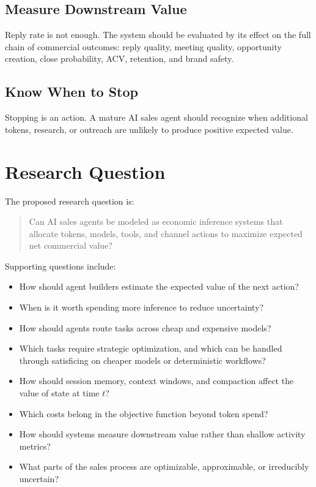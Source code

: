 \documentclass[12pt]{article}
\begin{document}
\subsection{Measure Downstream Value}

Reply rate is not enough. The system should be evaluated by its effect on the
full chain of commercial outcomes: reply quality, meeting quality, opportunity
creation, close probability, ACV, retention, and brand safety.

\subsection{Know When to Stop}

Stopping is an action. A mature AI sales agent should recognize when additional
tokens, research, or outreach are unlikely to produce positive expected value.

\section{Research Question}

The proposed research question is:

\begin{quote}
    Can AI sales agents be modeled as economic inference systems that allocate
    tokens, models, tools, and channel actions to maximize expected net
    commercial value?
\end{quote}

Supporting questions include:

\begin{itemize}
    \item How should agent builders estimate the expected value of the next
    action?
    \item When is it worth spending more inference to reduce uncertainty?
    \item How should agents route tasks across cheap and expensive models?
    \item Which tasks require strategic optimization, and which can be handled
    through satisficing on cheaper models or deterministic workflows?
    \item How should session memory, context windows, and compaction affect the
    value of state at time \(t\)?
    \item Which costs belong in the objective function beyond token spend?
    \item How should systems measure downstream value rather than shallow
    activity metrics?
    \item What parts of the sales process are optimizable, approximable, or
    irreducibly uncertain?
\end{itemize}
\end{document}
